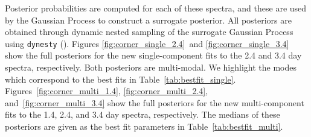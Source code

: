 \documentclass[twocolumn,twocolappendix]{aastex63}
\begin{document}
{Posterior probabilities are computed for each of these spectra, and these are used by the Gaussian Process to construct a surrogate posterior. All posteriors are obtained through dynamic nested sampling of the surrogate Gaussian Process using \texttt{dynesty} (\citealt{speagle20}). Figures \ref{fig:corner_single_2.4}~and \ref{fig:corner_single_3.4} show the full posteriors for the new single-component fits to the 2.4 and 3.4 day spectra, respectively. Both posteriors are multi-modal. We highlight the modes which correspond to the best fits in Table~\ref{tab:bestfit_single}. Figures~\ref{fig:corner_multi_1.4}, \ref{fig:corner_multi_2.4}, and~\ref{fig:corner_multi_3.4} show the full posteriors for the new multi-component fits to the 1.4, 2.4, and 3.4 day spectra, respectively. The medians of these posteriors are given as the best fit parameters in Table~\ref{tab:bestfit_multi}. 


}
\end{document}
